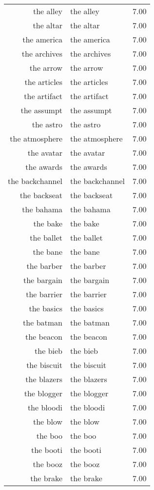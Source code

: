\begin{table}[ht]
\begin{tabular}{rlr}
  the alley & the alley & 7.00 \\ 
  the altar & the altar & 7.00 \\ 
  the america & the america & 7.00 \\ 
  the archives & the archives & 7.00 \\ 
  the arrow & the arrow & 7.00 \\ 
  the articles & the articles & 7.00 \\ 
  the artifact & the artifact & 7.00 \\ 
  the assumpt & the assumpt & 7.00 \\ 
  the astro & the astro & 7.00 \\ 
  the atmosphere & the atmosphere & 7.00 \\ 
  the avatar & the avatar & 7.00 \\ 
  the awards & the awards & 7.00 \\ 
  the backchannel & the backchannel & 7.00 \\ 
  the backseat & the backseat & 7.00 \\ 
  the bahama & the bahama & 7.00 \\ 
  the bake & the bake & 7.00 \\ 
  the ballet & the ballet & 7.00 \\ 
  the bane & the bane & 7.00 \\ 
  the barber & the barber & 7.00 \\ 
  the bargain & the bargain & 7.00 \\ 
  the barrier & the barrier & 7.00 \\ 
  the basics & the basics & 7.00 \\ 
  the batman & the batman & 7.00 \\ 
  the beacon & the beacon & 7.00 \\ 
  the bieb & the bieb & 7.00 \\ 
  the biscuit & the biscuit & 7.00 \\ 
  the blazers & the blazers & 7.00 \\ 
  the blogger & the blogger & 7.00 \\ 
  the bloodi & the bloodi & 7.00 \\ 
  the blow & the blow & 7.00 \\ 
  the boo & the boo & 7.00 \\ 
  the booti & the booti & 7.00 \\ 
  the booz & the booz & 7.00 \\ 
  the brake & the brake & 7.00 \\ 

\end{tabular}
\end{table}
